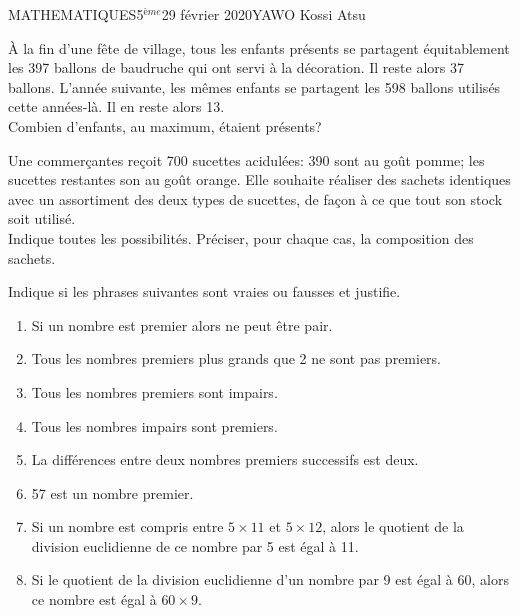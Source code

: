 \documentclass[12pt,a4paper]{book}
\newcommand{\prof}{YAWO Kossi Atsu}
\newcommand{\matiere}{MATHEMATIQUES}
\newcommand{\classe}{5$^{ème}$}
\begin{document}
\begin{td}{\matiere}{\classe}{29 février 2020}{\prof}
\begin{exo}
À la fin d'une fête de village, tous les enfants présents se partagent équitablement les 397 ballons de baudruche qui ont servi à la décoration. Il reste alors 37 ballons. L'année suivante, les mêmes enfants se partagent les 598 ballons utilisés cette années-là. Il en reste alors 13. \\
Combien d'enfants, au maximum, étaient présents?
\end{exo}

\begin{exo}
Une commerçantes reçoit 700 sucettes acidulées: 390 sont au goût pomme; les sucettes restantes son au goût orange. Elle souhaite réaliser des sachets identiques avec un assortiment des deux types de sucettes, de façon à ce que tout son stock soit utilisé.\\
Indique toutes les possibilités. Préciser, pour chaque cas, la composition des sachets.
\end{exo}

\begin{exo}
\setlength{\columnseprule}{1pt}
\begin{multicols}{2}
Indique si les phrases suivantes sont vraies ou fausses et justifie.
\begin{enumerate}
\item Si un nombre est premier alors ne peut être pair.
\item Tous les nombres premiers plus grands que 2 ne sont pas premiers.
\item Tous les nombres premiers sont impairs.
\item Tous les nombres impairs sont premiers.
\item La différences entre deux nombres premiers successifs est deux.
\item 57 est un nombre premier.
\item Si un nombre est compris entre $5 \times 11$ et $5 \times 12$, alors le quotient de la division euclidienne de ce nombre par 5 est égal à 11.
\item Si le quotient de la division euclidienne d'un nombre par 9 est égal à 60, alors ce nombre est égal à $60 \times 9$.
\end{enumerate}
\end{multicols}

\end{exo}


\end{td}
\end{document}
